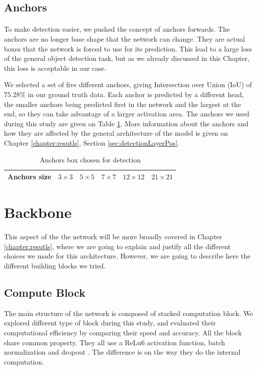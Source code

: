 \subsection{Anchors}
\paragraph{}
To make detection easier, we pushed the concept of anchors forwards. The anchors are no longer base shape that the network can change. They are actual boxes that the network is forced to use for its prediction. This lead to a large loss of the general object detection task, but as we already discussed in this Chapter, this loss is acceptable in our case.

We selected a set of five different anchors, giving Intersection over Union (IoU) of $75.28\%$ in our ground truth data. Each anchor is predicted by a different head, the smaller anchors being predicted first in the network and the largest at the end, so they can take advantage of a larger activation area. The anchors we used during this study are given on Table \ref{tab:anchors}. More information about the anchors and how they are affected by the general architecture of the model is given on Chapter \ref{chapter:resutls}, Section \ref{sec:detectionLayerPos}.

\begin{table}[]
    \centering
    \caption{Anchors box chosen for detection}
    \begin{tabular}{|l|c|c|c|c|c|}
        \hline
        Anchors size & $3\times3$ & $5\times5$ & $7\times7$ & $12\times12$ & $21\times21$ \\
        \hline
    \end{tabular}
    \label{tab:anchors}
\end{table}{}

\section{Backbone}
\paragraph{}
This aspect of the the network will be more broadly covered in Chapter \ref{chapter:resutls}, where we are going to explain and justify all the different choices we made for this architecture. However, we are going to describe here the different building blocks we tried.
\subsection{Compute Block}
The main structure of the network is composed of stacked computation block. We explored different type of block during this study, and evaluated their computational efficiency by comparing their speed and accuracy. All the block share common property. They all use a ReLu6 \cite{sandler2018mobilenetv2} activation function, batch normalization \cite{ioffe2015batch} and dropout \cite{srivastava2014dropout}. The difference is on the way they do the internal computation.

